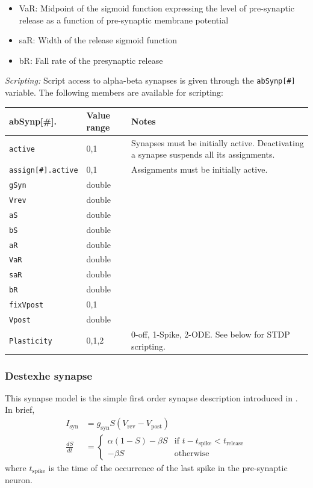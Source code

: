 \documentclass{article}
\begin{document}
\begin{itemize}
	\item VaR: Midpoint of the sigmoid function expressing the level of
	pre-synaptic release as a function of pre-synaptic membrane
	potential
	\item saR: Width of the release sigmoid function
	\item bR: Fall rate of the presynaptic release
\end{itemize}

\noindent
\emph{Scripting:} Script access to alpha-beta synapses is given through the \texttt{abSynp[\#]} variable.
The following members are available for scripting: \\
\begin{tabularx}{\linewidth}{|ll|X|}
	\hline
	{\bf abSynp[\#].\textvisiblespace} & {\bf Value range} & {\bf Notes} \\
	\hline
	\texttt{active} & 0,1 & Synapses must be initially active. Deactivating a synapse suspends all
	its assignments. \\
	\texttt{assign[\#].active} & 0,1 & Assignments must be initially active. \\
	\texttt{gSyn} & double & \\
	\texttt{Vrev} & double & \\
	\texttt{aS} & double & \\
	\texttt{bS} & double & \\
	\texttt{aR} & double & \\
	\texttt{VaR} & double & \\
	\texttt{saR} & double & \\
	\texttt{bR} & double & \\
	\texttt{fixVpost} & 0,1 & \\
	\texttt{Vpost} & double & \\
	\texttt{Plasticity} & 0,1,2 & 0-off, 1-Spike, 2-ODE. See below for STDP scripting. \\
	\hline
\end{tabularx}


\subsubsection{Destexhe synapse}
This synapse model is the simple first order synapse description
introduced in \cite{Destexhe1994}. In brief,
\begin{align}
I_{\text{syn}}&= g_{\text{syn}} S (V_{\text{rev}} -
V_{\text{post}}) \\
\frac{dS}{dt} &= \left\{ \begin{array}{ll} 
  \alpha (1-S) - \beta S & \text{if } t-t_{\text{spike}} < t_{\text{release}} \\
- \beta S & \text{otherwise} 
\end{array} \right.
\end{align}
where $t_{\text{spike}}$ is the time of the occurrence of the last
spike in the pre-synaptic neuron.
\end{document}
